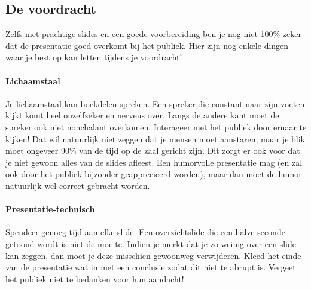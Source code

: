 \documentclass[a4paper]{article}
\begin{document}
\subsection{De voordracht}

Zelfs met prachtige slides en een goede voorbereiding ben je nog niet 100\% zeker dat de presentatie goed overkomt bij het publiek.
Hier zijn nog enkele dingen waar je best op kan letten tijdens je voordracht!


\paragraph{Lichaamstaal}

Je lichaamstaal kan boekdelen spreken.
Een spreker die constant naar zijn voeten kijkt komt heel onzelfzeker en nerveus over.
Langs de andere kant moet de spreker ook niet nonchalant overkomen.
Interageer met het publiek door ernaar te kijken! Dat wil natuurlijk niet zeggen dat je mensen moet aanstaren, maar je blik moet ongeveer 90\% van de tijd op de zaal gericht zijn.
Dit zorgt er ook voor dat je niet gewoon alles van de slides afleest.
Een humorvolle presentatie mag (en zal ook door het publiek bijzonder geapprecieerd worden), maar dan moet de humor natuurlijk wel correct gebracht worden.


\paragraph{Presentatie-technisch}

Spendeer genoeg tijd aan elke slide.
Een overzichtslide die een halve seconde getoond wordt is niet de moeite.
Indien je merkt dat je zo weinig over een slide kan zeggen, dan moet je deze misschien gewoonweg verwijderen.
Kleed het einde van de presentatie wat in met een conclusie zodat dit niet te abrupt is.
Vergeet het publiek niet te bedanken voor hun aandacht!



\end{document}
